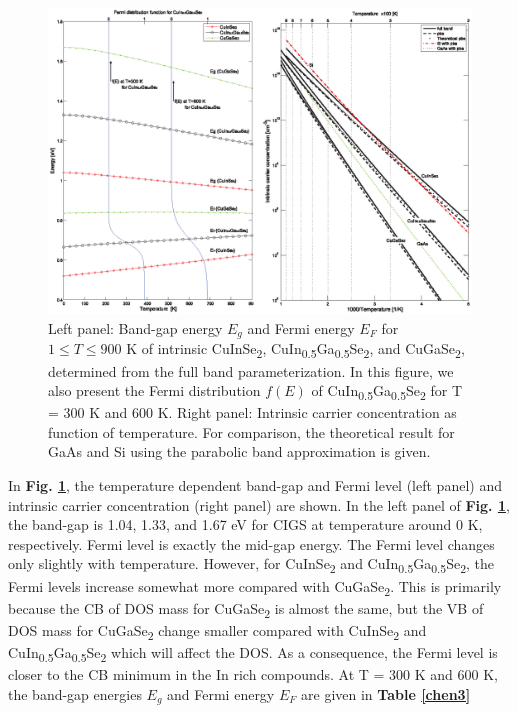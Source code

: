 \documentclass[a4paper, 12pt, titlepage,oneside,drop]{kthesis}
\begin{document}
 \begin{figure}[H]
    \begin{center}
            \includegraphics[width=1\textwidth,clip]{JAP4}
     \end{center}
    \caption{Left panel: Band-gap energy $E_g$ and Fermi energy $E_F$ for $1 \leq T \leq 900$ K of intrinsic CuInSe\textsubscript{2}, CuIn\textsubscript{0.5}Ga\textsubscript{0.5}Se\textsubscript{2}, and CuGaSe\textsubscript{2},
    determined from the full band parameterization. In this figure, we also present the Fermi distribution $f(E)$ of CuIn\textsubscript{0.5}Ga\textsubscript{0.5}Se\textsubscript{2} for T = 300 K and 600 K. Right panel: 
    Intrinsic carrier concentration as function of temperature. For comparison, the theoretical result for GaAs and Si using the parabolic band approximation is given.}
   \label{icc}
\end{figure}


In \textbf{Fig. \ref{icc}}, the temperature dependent band-gap and Fermi level (left panel) and intrinsic carrier concentration (right panel) are shown.  In the left panel of \textbf{Fig. \ref{icc}}, the band-gap is 1.04, 1.33,
and 1.67 eV for CIGS at temperature around 0 K, respectively. Fermi level is exactly the mid-gap energy. The Fermi level changes only slightly with temperature. However, 
for CuInSe\textsubscript{2} and CuIn\textsubscript{0.5}Ga\textsubscript{0.5}Se\textsubscript{2}, the Fermi levels increase somewhat more compared with CuGaSe\textsubscript{2}. This is primarily because the CB of DOS mass for 
CuGaSe\textsubscript{2} is almost the same, but the VB of DOS mass for CuGaSe\textsubscript{2} change smaller compared with CuInSe\textsubscript{2} and CuIn\textsubscript{0.5}Ga\textsubscript{0.5}Se\textsubscript{2} which will 
affect the DOS. As a consequence, the Fermi level is closer to the CB minimum in the In rich compounds. At T = 300 K and 600 K, the band-gap energies $E_g$ and Fermi energy $E_F$ are given in \textbf{Table \ref{chen3}}
\end{document}
